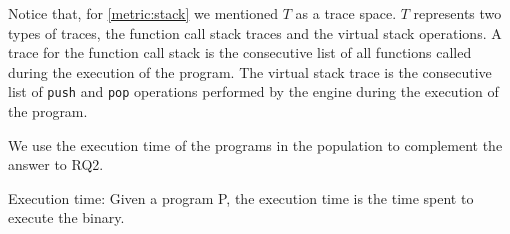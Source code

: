 Notice that, for \autoref{metric:stack} we mentioned $T$ as a trace space. $T$ represents two types of traces, the function call stack traces and the virtual stack operations. A trace for the function call stack is the consecutive list of all functions called during the execution of the \wasm program. The virtual stack trace is the consecutive list of \texttt{push} and \texttt{pop} operations performed by the \wasm engine during the execution of the program.

We use the execution time of the programs in the population to complement the answer to RQ2.

\begin{metric}{Execution time:}\label{metric:time}
	Given a \wasm program P, the execution time is the time spent to execute the binary.
\end{metric}

